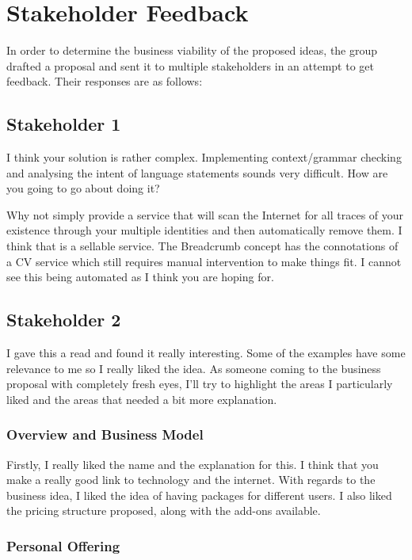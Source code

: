 \section{Stakeholder Feedback}

  In order to determine the business viability of the proposed ideas, the group drafted a proposal and sent it to multiple stakeholders in an attempt to get feedback. Their responses are as follows:

  \subsection{Stakeholder 1}

    I think your solution is rather complex. Implementing context/grammar checking and analysing the intent of language statements sounds very difficult. How are you going to go about doing it?

    Why not simply provide a service that will scan the Internet for all traces of your existence through your multiple identities and then automatically remove them. I think that is a sellable service. The Breadcrumb concept has the connotations of a CV service which still requires manual intervention to make things fit. I cannot see this being automated as I think you are hoping for.

  \subsection{Stakeholder 2}

    I gave this a read and found it really interesting. Some of the examples have some relevance to me so I really liked the idea. As someone coming to the business proposal with completely fresh eyes, I'll try to highlight the areas I particularly liked and the areas that needed a bit more explanation.

    \subsubsection{Overview and Business Model}

      Firstly, I really liked the name and the explanation for this. I think that you make a really good link to technology and the internet. With regards to the business idea, I liked the idea of having packages for different users. I also liked the pricing structure proposed, along with the add-ons available.

    \subsubsection{Personal Offering}

